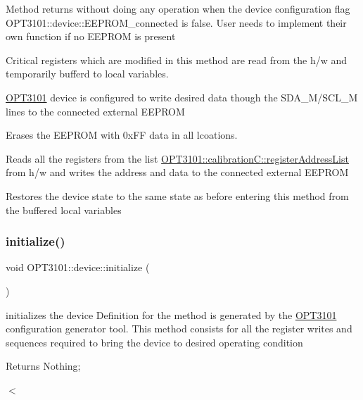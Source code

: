 \begin{DoxyItemize}
\item Method returns without doing any operation when the device configuration flag O\+P\+T3101\+::device\+::\+E\+E\+P\+R\+O\+M\+\_\+connected is false. User needs to implement their own function if no E\+E\+P\+R\+OM is present
\item Critical registers which are modified in this method are read from the h/w and temporarily bufferd to local variables.
\item \mbox{\hyperlink{namespace_o_p_t3101}{O\+P\+T3101}} device is configured to write desired data though the S\+D\+A\+\_\+\+M/\+S\+C\+L\+\_\+M lines to the connected external E\+E\+P\+R\+OM
\item Erases the E\+E\+P\+R\+OM with 0x\+FF data in all lcoations.
\item Reads all the registers from the list \mbox{\hyperlink{class_o_p_t3101_1_1calibration_c_a8ddd81159778cc987557c9b4920d5b57}{O\+P\+T3101\+::calibration\+C\+::register\+Address\+List}} from h/w and writes the address and data to the connected external E\+E\+P\+R\+OM
\item Restores the device state to the same state as before entering this method from the buffered local variables 
\end{DoxyItemize}\mbox{\label{class_o_p_t3101_1_1device_ae3b7fb4f9a8f1dee330523e034aa9460}} 
\subsubsection{\texorpdfstring{initialize()}{initialize()}}
{\footnotesize\ttfamily void O\+P\+T3101\+::device\+::initialize (\begin{DoxyParamCaption}{ }\end{DoxyParamCaption})}



initializes the device Definition for the method is generated by the \mbox{\hyperlink{namespace_o_p_t3101}{O\+P\+T3101}} configuration generator tool. This method consists for all the register writes and sequences required to bring the device to desired operating condition 

\begin{DoxyReturn}{Returns}
Nothing; 
\end{DoxyReturn}
$<$ \mbox{\label{class_o_p_t3101_1_1device_acb915ffb10d3c725fe4a58f22d69d27d}} 
